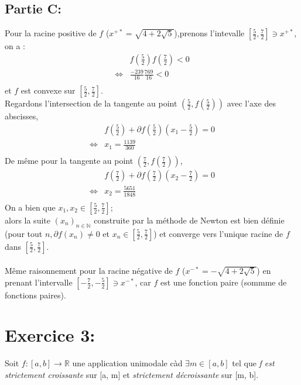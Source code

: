 \documentclass[a4paper, 12pt]{article}
\begin{document}
\newpage
\subsection{Partie C:}
Pour la racine positive de $f$ ($x^{+*}=\sqrt{4+2\sqrt{5}}$),prenons l'intevalle $[\frac{5}{2},\frac{7}{2}]\ni x^{+*}$,\\
on a :
\begin{align*}
&f(\frac{5}{2})f(\frac{7}{2})<0 \\
\Leftrightarrow&\frac{-239}{16}\frac{769}{16}<0\\
\end{align*}
et $f$ est convexe sur $[\frac{5}{2},\frac{7}{2}]$.\\
Regardons l'intersection de la tangente au point $(\frac{5}{2},f(\frac{5}{2}))$ avec l'axe des abscisses,\\
\begin{align*}
&f(\frac{5}{2})+\partial f(\frac{5}{2})(x_1-\frac{5}{2})=0\\
\Leftrightarrow& x_1=\frac{1139}{360}\\
\end{align*}
De même pour la tangente au point $(\frac{7}{2},f(\frac{7}{2}))$,\\
\begin{align*}
&f(\frac{7}{2})+\partial f(\frac{7}{2})(x_2-\frac{7}{2})=0\\
\Leftrightarrow& x_2=\frac{5651}{1848}\\
\end{align*}
On a bien que $x_1,x_2\in[\frac{5}{2},\frac{7}{2}]$;\\
alors la suite $(x_n)_{n\in\mathbb{N}}$ construite par la méthode de Newton est bien définie (pour tout $n , \partial f(x_n)\neq 0$ et $x_n\in [\frac{5}{2},\frac{7}{2}]$) et converge vers l'unique racine de $f$ dans $[\frac{5}{2},\frac{7}{2}]$.\\
\\
Même raisonnement pour la racine négative de $f$ ($x^{-*}=-\sqrt{4+2\sqrt{5}}$) en prenant l'intervalle $[-\frac{7}{2},-\frac{5}{2}]\ni x^{-*}$, car $f$ est une fonction paire (sommme de fonctions paires).
\newpage
\section{Exercice 3:}
Soit \( f : [a, b] \rightarrow \mathbb{R} \) une application unimodale càd \( \exists m \in [a, b] \) tel que \emph{f est strictement croissante} sur [a, m] et \emph{strictement décroissante} sur [m, b].
\end{document}
